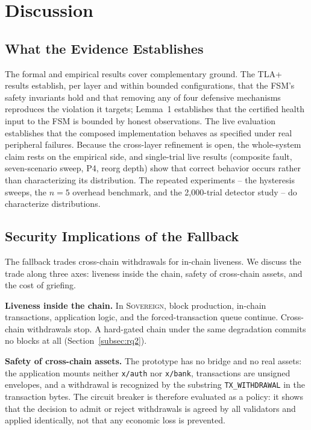 \section{Discussion}
\label{sec:discussion}

\subsection{What the Evidence Establishes}

The formal and empirical results cover complementary ground. The TLA+
results establish, per layer and within bounded configurations, that the
FSM's safety invariants hold and that removing any of four defensive
mechanisms reproduces the violation it targets; Lemma~1 establishes that the certified health input
to the FSM is bounded by honest observations. The live evaluation
establishes that the composed implementation behaves as specified under
real peripheral failures. Because the cross-layer refinement is open, the
whole-system claim rests on the empirical side, and single-trial live
results (composite fault, seven-scenario sweep, P4, reorg depth) show that
correct behavior occurs rather than characterizing its distribution. The
repeated experiments -- the hysteresis sweeps, the $n{=}5$ overhead
benchmark, and the 2{,}000-trial detector study -- do characterize
distributions.

\subsection{Security Implications of the Fallback}

The fallback trades cross-chain withdrawals for in-chain liveness. We
discuss the trade along three axes: liveness inside the chain, safety of
cross-chain assets, and the cost of griefing.

\textbf{Liveness inside the chain.} In \textsc{Sovereign}, block production,
in-chain transactions, application logic, and the forced-transaction queue
continue. Cross-chain withdrawals stop. A hard-gated chain under the same
degradation commits no blocks at all (Section~\ref{subsec:rq2}).

\textbf{Safety of cross-chain assets.} The prototype has no bridge and no
real assets: the application mounts neither \texttt{x/auth} nor
\texttt{x/bank}, transactions are unsigned envelopes, and a withdrawal is
recognized by the substring \texttt{TX\_WITHDRAWAL} in the transaction bytes.
The circuit breaker is therefore evaluated as a policy: it shows that the
decision to admit or reject withdrawals is agreed by all validators and
applied identically, not that any economic loss is prevented.

